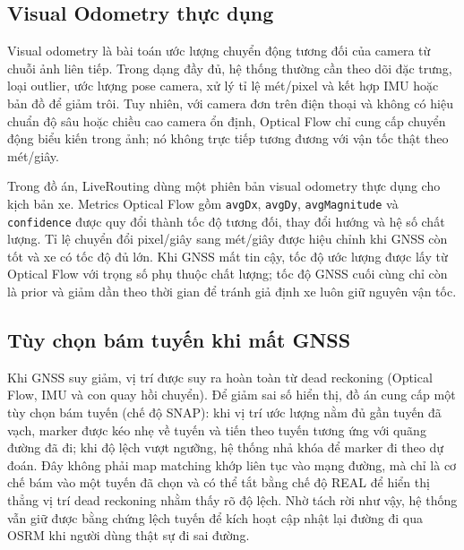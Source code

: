 \documentclass[../DoAn.tex]{subfiles}
\begin{document}
\subsection{Visual Odometry thực dụng}
\label{subsection:3.6.2}
Visual odometry là bài toán ước lượng chuyển động tương đối của camera từ chuỗi ảnh liên tiếp. Trong dạng đầy đủ, hệ thống thường cần theo dõi đặc trưng, loại outlier, ước lượng pose camera, xử lý tỉ lệ mét/pixel và kết hợp IMU hoặc bản đồ để giảm trôi. Tuy nhiên, với camera đơn trên điện thoại và không có hiệu chuẩn độ sâu hoặc chiều cao camera ổn định, Optical Flow chỉ cung cấp chuyển động biểu kiến trong ảnh; nó không trực tiếp tương đương với vận tốc thật theo mét/giây.

Trong đồ án, LiveRouting dùng một phiên bản visual odometry thực dụng cho kịch bản xe. Metrics Optical Flow gồm \texttt{avgDx}, \texttt{avgDy}, \texttt{avgMagnitude} và \texttt{confidence} được quy đổi thành tốc độ tương đối, thay đổi hướng và hệ số chất lượng. Tỉ lệ chuyển đổi pixel/giây sang mét/giây được hiệu chỉnh khi GNSS còn tốt và xe có tốc độ đủ lớn. Khi GNSS mất tin cậy, tốc độ ước lượng được lấy từ Optical Flow với trọng số phụ thuộc chất lượng; tốc độ GNSS cuối cùng chỉ còn là prior và giảm dần theo thời gian để tránh giả định xe luôn giữ nguyên vận tốc.

\subsection{Tùy chọn bám tuyến khi mất GNSS}
\label{subsection:3.6.3}
Khi GNSS suy giảm, vị trí được suy ra hoàn toàn từ dead reckoning (Optical Flow, IMU và con quay hồi chuyển). Để giảm sai số hiển thị, đồ án cung cấp một tùy chọn bám tuyến (chế độ SNAP): khi vị trí ước lượng nằm đủ gần tuyến đã vạch, marker được kéo nhẹ về tuyến và tiến theo tuyến tương ứng với quãng đường đã đi; khi độ lệch vượt ngưỡng, hệ thống nhả khóa để marker đi theo dự đoán. Đây không phải map matching khớp liên tục vào mạng đường, mà chỉ là cơ chế bám vào một tuyến đã chọn và có thể tắt bằng chế độ REAL để hiển thị thẳng vị trí dead reckoning nhằm thấy rõ độ lệch. Nhờ tách rời như vậy, hệ thống vẫn giữ được bằng chứng lệch tuyến để kích hoạt cập nhật lại đường đi qua OSRM khi người dùng thật sự đi sai đường.
\end{document}
